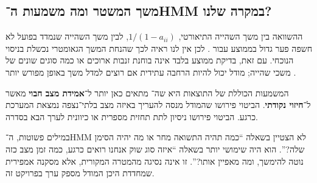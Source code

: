 \subsection{משך המשטר ומה משמעות ה־HMM במקרה שלנו?}

ההשוואה בין משך השהייה התיאורטי, \(1/(1-a_{ii})\), לבין משך השהייה שנמדד בפועל לא חשפה פער גדול בממוצע עבור . לכן אין לנו ראיה לכך שהנחת המשך הגאומטרי נכשלת בניסוי הנוכחי. עם זאת, בדיקת ממוצע בלבד אינה בוחנת זנבות ארוכים או כמה סוגים שונים של משכי שהייה; מודל  יכול להיות הרחבה עתידית אם רוצים למדל משך באופן מפורש יותר \cite{bulla2006application}.

המשמעות הכוללת של התוצאות היא שה־ מתאים כאן יותר ל־\textbf{אמידת מצב חבוי} מאשר ל־\textbf{חיזוי נקודתי}. הביטוי  פירושו שהמודל מנסה להעריך באיזה מצב בלתי־נצפה נמצאת המערכת כרגע. הביטוי  פירושו ניסיון לתת תחזית מספרית או כיוונית לערך הבא בסדרה.

במילים פשוטות, ה־HMM לא הצטיין בשאלה ``כמה תהיה התשואה מחר או מה יהיה הסימן שלה?''. הוא היה שימושי יותר בשאלה ``איזה סוג שוק אנחנו רואים כרגע, כמה זמן מצב כזה נוטה להימשך, ומה מאפיין אותו?''. זו אינה נסיגה מהמטרה המקורית, אלא מסקנה אמפירית שמחדדת היכן המודל מספק ערך בפרויקט זה.
